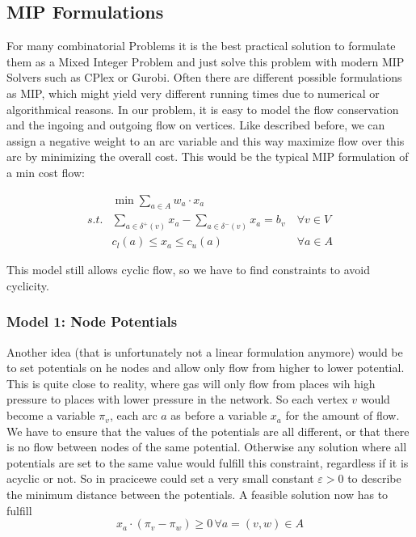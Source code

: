 


\subsection{MIP Formulations}
For many combinatorial Problems it is the best practical solution to formulate them as a Mixed Integer Problem and just 
solve this problem with modern MIP Solvers such as CPlex or Gurobi. Often there are different possible formulations as 
MIP, which might yield very different running times due to numerical or algorithmical reasons. In our problem, it is 
easy to model the flow conservation and the ingoing and outgoing flow on vertices. Like described before, we can assign 
a negative weight to an arc variable and this way maximize flow over this arc by minimizing the overall cost. This 
would be the typical MIP formulation of a min cost flow:

\begin{align*}
  &\min \sum_{a\in A} w_a\cdot x_a  \\
 s.t. & \sum_{a\in \delta^+(v)}x_a - \sum_{a\in\delta^- (v)}x_a = b_v\ &\forall v\in V \\
  & c_l(a)\le x_a \le c_u(a) & \forall a\in A
\end{align*}

This model still allows cyclic flow, so we have to find constraints to avoid cyclicity. 
\subsubsection{Model 1: Node Potentials}

Another idea (that is unfortunately not a linear formulation anymore) would be to set potentials on he nodes and allow 
only flow from higher to lower potential. This is quite close to reality, where gas will only flow from places wih high 
pressure to places with lower pressure in the network. So each vertex $v$ would become a variable $\pi_v$, each arc $a$ 
as before a variable $x_a$ for the amount of flow. We have to ensure that the values of the potentials are all 
different, or that there is no flow between nodes of the same potential. Otherwise any solution where all potentials 
are set to the same value would fulfill this constraint, regardless if it is acyclic or not. So in pracicewe could set 
a very small constant $\varepsilon > 0$ to describe the minimum distance between the potentials. A feasible solution 
now has to fulfill $$x_a\cdot (\pi_v -\pi_w)\ge 0\,\forall a=(v,w)\in A$$

